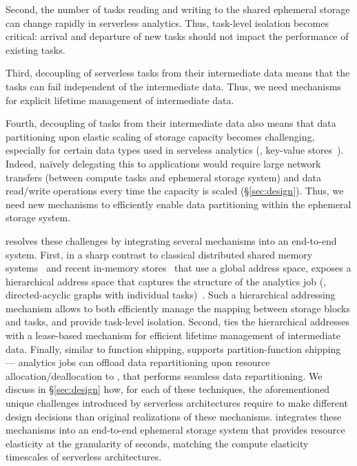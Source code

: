 Second, the number of tasks reading and writing to the shared ephemeral storage can change rapidly in serverless analytics. Thus, task-level isolation becomes critical: arrival and departure of new tasks should not impact the performance of existing tasks.

Third, decoupling of serverless tasks from their intermediate data means that the tasks can fail independent of the intermediate data. Thus, we need mechanisms for explicit lifetime management of intermediate data.
  
Fourth, decoupling of tasks from their intermediate data also means that data partitioning upon elastic scaling of storage capacity becomes challenging, especially for certain data types used in serveless analytics (\eg, key-value stores~\cite{pywren, locus, starling, gg, cirrus, cloudburst, pocket, starling}). Indeed, na\"ively delegating this to applications would require large network transfers (between compute tasks and ephemeral storage system) and data read/write operations every time the capacity is scaled (\S\ref{sec:design}). Thus, we need new mechanisms to efficiently enable data partitioning within the ephemeral storage system.

\jiffy resolves these challenges by integrating several mechanisms into an end-to-end system. First, in a sharp contrast to classical distributed shared memory systems~\cite{ivy, mirage, emerald, clouds, dsmdir} and recent in-memory stores~\cite{mica, ramcloud, farm, redis} that use a global address space, \jiffy exposes a hierarchical address space that captures the structure of the analytics job (\eg, directed-acyclic graphs with individual tasks)~\cite{qoop, snowset}. Such a hierarchical addressing mechanism allows \jiffy to both efficiently manage the mapping between storage blocks and tasks, and provide task-level isolation. Second, \jiffy ties the hierarchical addresses with a lease-based mechanism for efficient lifetime management of intermediate data. Finally, similar to function shipping, \jiffy supports partition-function shipping --- analytics jobs can offload data repartitioning upon resource allocation/deallocation to \jiffy, that performs seamless data repartitioning. We discuss in \S\ref{sec:design} how, for each of these techniques, the aforementioned unique challenges introduced by serverless architectures require \jiffy to make different design decisions than original realizations of these mechanisms. \jiffy integrates these mechanisms into an end-to-end ephemeral storage system that provides resource elasticity at the granularity of seconds, matching the compute elasticity timescales of serverless architectures. 


